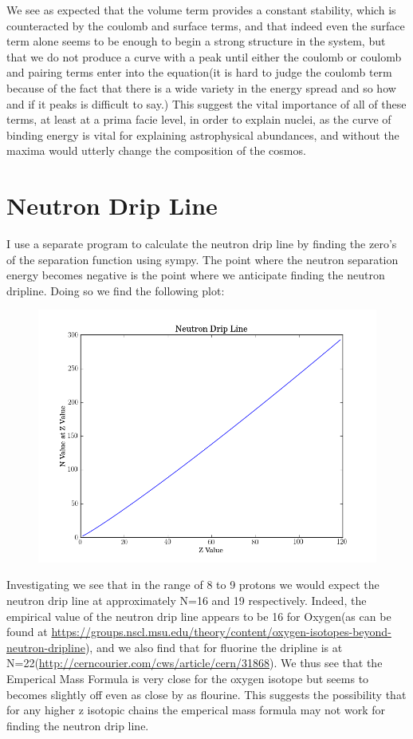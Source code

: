 \documentclass[11pt]{article} %
\begin{document}
We see as expected that the volume term provides a constant stability, which is counteracted by the coulomb and surface terms, and that indeed even the surface term alone seems to be enough to begin a strong structure in the system, but that we do not produce a curve with a peak until either the coulomb or coulomb and pairing terms enter into the equation(it is hard to judge the coulomb term because of the fact that there is a wide variety in the energy spread and so how and if it peaks is difficult to say.) This suggest the vital importance of all of these terms, at least at a prima facie level, in order to explain nuclei, as  the curve of binding energy is vital for explaining astrophysical abundances, and without the maxima would utterly change the composition of the cosmos.\\
\newpage

\section{Neutron Drip Line}

I use a separate program to calculate the neutron drip line by finding the zero's of the separation function using sympy. The point where the neutron separation energy becomes negative is the point where we anticipate finding the neutron dripline. Doing so we find the following plot:\\

\vspace{1mm}
\begin{figure}[htbp]
\centering
\includegraphics[width=.7\linewidth]{"NeutronDripLine"}
\end{figure}
\vspace{1mm}


Investigating we see that in the range of 8 to 9 protons we would expect the neutron drip line at approximately N=16 and 19 respectively. Indeed, the empirical value of the neutron drip line appears to be 16 for Oxygen(as can be found at \url{https://groups.nscl.msu.edu/theory/content/oxygen-isotopes-beyond-neutron-dripline}), and we also find that for fluorine the dripline is at N=22(\url{http://cerncourier.com/cws/article/cern/31868}). We thus see that the Emperical Mass Formula is very close for the oxygen isotope but seems to becomes slightly off even as close by as flourine. This suggests the possibility that for any higher z isotopic chains the emperical mass formula may not work for finding the neutron drip line.
\newpage
\end{document}
